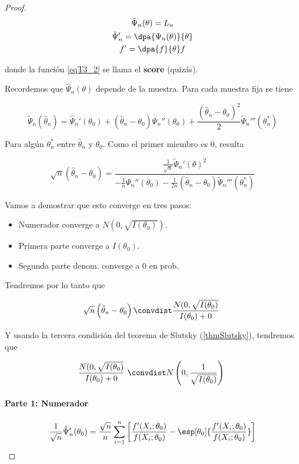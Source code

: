\documentclass{apuntes}
\begin{document}
\begin{proof}

\begin{gather}
 \tilde\Psi_n(\theta) = L_n  \\
 \tilde\Psi_n' = \dpa{\Psi_n(\theta)}{\theta} \label{eqT3_2} \\
 f' = \dpa{f}{\theta}f
 \end{gather}

 donde la función \ref{eqT3_2} se llama el \textbf{score} (quizás).

 Recordemos que $\hat\Psi_n(\theta)$ depende de la muestra. Para cada muestra fija se tiene

 \[ \tilde\Psi_n(\hat\theta_n) = \hat\Psi_n'(\theta_0) + (\hat\theta_n-\theta_0)\Psi_n''(\theta_0) + \frac{\left(\hat\theta_n-\theta_0\right)^2}{2}\tilde\Psi_n'''(\theta_n^\ast) \]

Para algún $\theta_n^\ast$ entre $\hat\theta_ n$ y $\theta_0$. Como el primer miembro es 0, resulta

\[ \sqrt{n}\left(\hat\theta_n-\theta_0\right) = \frac{\frac{1}{\sqrt{n}}\tilde\Psi_n'(\theta)^2}{-\frac{1}{n}\Psi_n''(\theta_0) - \frac{1}{2n}\left(\hat\theta_n-\theta_0\right)\tilde\Psi_n'''(\theta_n^\ast)} \]

Vamos a demostrar que esto converge en tres pasos:

\begin{itemize}
\item Numerador converge a $N(0,\sqrt{I(\theta_0)})$.
\item Primera parte converge a $I(\theta_0)$.
\item Segunda parte denom. converge a 0 en prob.
\end{itemize}

Tendremos por lo tanto que

\[ \sqrt{n}\left(\hat\theta_n-\theta_0\right) \convdist \frac{N(0, \sqrt{I(\theta_0)}}{I(\theta_0)+0} \]

Y usando la tercera condición del teorema de Slutsky (\ref{thmSlutsky}), tendremos que

\[  \frac{N(0, \sqrt{I(\theta_0)}}{I(\theta_0)+0}  \convdist N\left(0,\frac{1}{\sqrt{I(\theta_0)}}\right) \]

\paragraph{Parte 1: Numerador}

\[ \frac{1}{\sqrt{n}}\tilde\Psi_n'(\theta_0) = \frac{\sqrt{n}}{n}\sum_{i=1}^n \left[\frac{f'(X_i;\theta_0)}{f(X_i;\theta_0)} - \esp[\theta_0]{\frac{f'(X_i;\theta_0)}{f(X_i;\theta_0)}}\right] \]


\end{proof}
\end{document}
